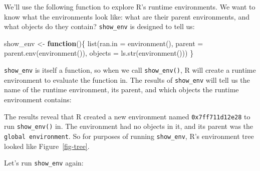 \documentclass[
  letterpaper,
  DIV=11,
  numbers=noendperiod]{scrbook}
\newenvironment{Shaded}{\begin{snugshade}}{\end{snugshade}}
\newcommand{\AttributeTok}[1]{\textcolor[rgb]{0.40,0.45,0.13}{#1}}
\newcommand{\ControlFlowTok}[1]{\textcolor[rgb]{0.00,0.23,0.31}{\textbf{#1}}}
\newcommand{\DocumentationTok}[1]{\textcolor[rgb]{0.37,0.37,0.37}{\textit{#1}}}
\newcommand{\FunctionTok}[1]{\textcolor[rgb]{0.28,0.35,0.67}{#1}}
\newcommand{\NormalTok}[1]{\textcolor[rgb]{0.00,0.23,0.31}{#1}}
\newcommand{\OtherTok}[1]{\textcolor[rgb]{0.00,0.23,0.31}{#1}}
\begin{document}
We'll use the following function to explore R's runtime environments. We
want to know what the environments look like: what are their parent
environments, and what objects do they contain? \texttt{show\_env} is
designed to tell us:

\begin{Shaded}
\begin{Highlighting}[]
\NormalTok{show\_env }\OtherTok{\textless{}{-}} \ControlFlowTok{function}\NormalTok{()\{}
  \FunctionTok{list}\NormalTok{(}\AttributeTok{ran.in =} \FunctionTok{environment}\NormalTok{(), }
    \AttributeTok{parent =} \FunctionTok{parent.env}\NormalTok{(}\FunctionTok{environment}\NormalTok{()), }
    \AttributeTok{objects =} \FunctionTok{ls.str}\NormalTok{(}\FunctionTok{environment}\NormalTok{()))}
\NormalTok{\}}
\end{Highlighting}
\end{Shaded}

\texttt{show\_env} is itself a function, so when we call
\texttt{show\_env()}, R will create a runtime environment to evaluate
the function in. The results of \texttt{show\_env} will tell us the name
of the runtime environment, its parent, and which objects the runtime
environment contains:

\begin{Shaded}
\end{Shaded}

The results reveal that R created a new environment named
\texttt{0x7ff711d12e28} to run \texttt{show\_env()} in. The environment
had no objects in it, and its parent was the
\texttt{global\ environment}. So for purposes of running
\texttt{show\_env}, R's environment tree looked like
Figure~\ref{fig-tree}.

Let's run \texttt{show\_env} again:

\begin{Shaded}
\end{Shaded}
\end{document}
